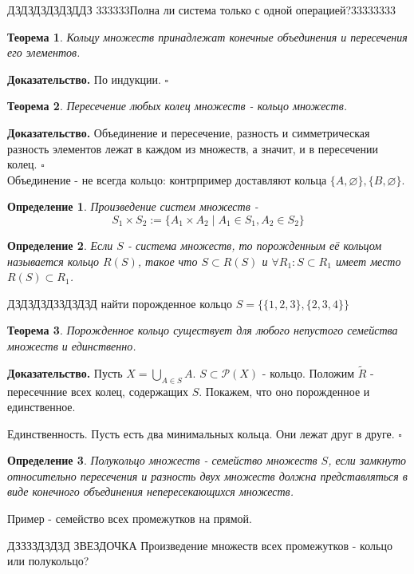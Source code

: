 \documentclass[a4paper]{article}
\newtheorem{defin}{Определение}
\newtheorem{theor}{Теорема}
\begin{document}
ДЗДЗДЗДЗДЗДДЗ 333333Полна ли система только с одной операцией?33333333

\begin{theor}
Кольцу множеств принадлежат конечные объединения и пересечения его элементов.
\end{theor}
\textbf{Доказательство.}  По индукции. 
$\square$ \\
\begin{theor}
Пересечение любых колец множеств - кольцо множеств.
\end{theor}
\textbf{Доказательство.} Объединение и пересечение, разность и симметрическая 
разность элементов лежат в каждом из множеств, а значит, и в пересечении 
колец. 
$\square$ \\
Объединение - не всегда кольцо: контрпример доставляют кольца
$\{A,\varnothing \},\{B,\varnothing \}$.
\begin{defin}
Произведение систем множеств - 
$$S_1\times S_2:=\{A_1\times A_2\mid A_1\in S_1,A_2\in S_2\}$$
\end{defin}
\begin{defin}
Если $S$ - система множеств, то порожденным её кольцом называется кольцо
 $R(S)$, такое что  $S\subset R(S)$ и $\forall  R_1:S\subset R_1$ имеет
 место $R(S)\subset R_1$. 
\end{defin}
ДЗДЗДЗДЗЗДЗДЗД найти порожденное кольцо $S=\{\{1,2,3\},\{2,3,4\}\}$
\begin{theor}
Порожденное кольцо существует для любого непустого семейства множеств 
и единственно. 
\end{theor}
\textbf{Доказательство.}  Пусть $X = \bigcup\limits_{A\in S}A$. 
$S\subset \mathcal{P}(X)$ - кольцо. Положим $\tilde R$ - пересечнние
всех колец, содержащих $S$. Покажем, что оно порожденное и 
единственное. 

Единственность. Пусть есть два минимальных кольца. Они лежат друг в друге.
$\square$ \\
\begin{defin}
Полукольцо множеств - семейство множеств $S$, если  замкнуто 
относительно пересечения и разность двух множеств должна представляться
в виде конечного объединения непересекающихся множеств.
\end{defin}
Пример - семейство всех промежутков на прямой. 

ДЗЗЗЗДЗДЗД ЗВЕЗДОЧКА Произведение множеств всех промежутков - кольцо или 
полукольцо?
\end{document}
